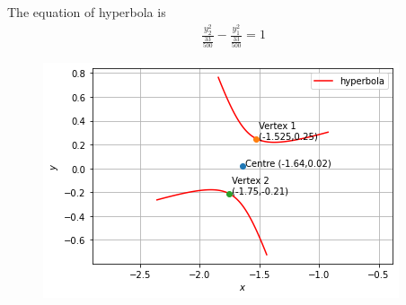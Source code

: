 \documentclass[journal,12pt,twocolumn]{IEEEtran}
\begin{document}
The equation of hyperbola is
\begin{align}
	\frac{y_2^2}{\frac{33}{500}}-\frac{y_1^2}{\frac{33}{500}}=1
\end{align}
\begin{figure}[!h]
	\includegraphics[width=\columnwidth]{hyper.png}
	\caption{} \label{linefig1}
\end{figure}
\end{document}

